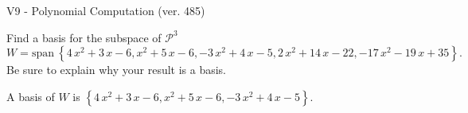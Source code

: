 \begin{exercise}
  \begin{exerciseTitle}V9 - Polynomial Computation (ver. 485)\end{exerciseTitle}
  \begin{exerciseStatement}
    Find a basis for the subspace of \(\mathcal{P}^3\) 
\[W=\mathrm{span}\ \left\{4 \, x^{2} + 3 \, x - 6 , x^{2} + 5 \, x - 6 , -3 \, x^{2} + 4 \, x - 5 , 2 \, x^{2} + 14 \, x - 22 , -17 \, x^{2} - 19 \, x + 35\right\}.\]
 Be sure to explain why your result is a basis.


  \end{exerciseStatement}
  \begin{exerciseAnswer}
   A basis of \(W\) is  \(\left\{4 \, x^{2} + 3 \, x - 6 , x^{2} + 5 \, x - 6 , -3 \, x^{2} + 4 \, x - 5\right\}\).
  


  \end{exerciseAnswer}
\end{exercise}